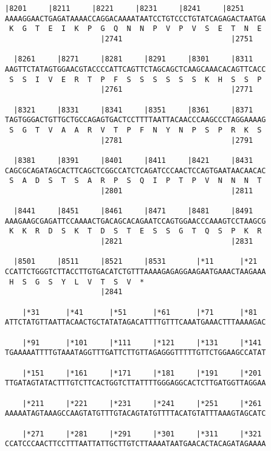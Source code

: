 \documentclass{article}
\begin{document}
\newpage
\begin{Verbatim}[fontfamily=courier]
  |8201     |8211     |8221     |8231     |8241     |8251   
AAAAGGAACTGAGATAAAACCAGGACAAAATAATCCTGTCCCTGTATCAGAGACTAATGA
 K  G  T  E  I  K  P  G  Q  N  N  P  V  P  V  S  E  T  N  E 
                      |2741                         |2751   

  |8261     |8271     |8281     |8291     |8301     |8311   
AAGTTCTATAGTGGAACGTACCCCATTCAGTTCTAGCAGCTCAAGCAAACACAGTTCACC
 S  S  I  V  E  R  T  P  F  S  S  S  S  S  S  K  H  S  S  P 
                      |2761                         |2771   

  |8321     |8331     |8341     |8351     |8361     |8371   
TAGTGGGACTGTTGCTGCCAGAGTGACTCCTTTTAATTACAACCCAAGCCCTAGGAAAAG
 S  G  T  V  A  A  R  V  T  P  F  N  Y  N  P  S  P  R  K  S 
                      |2781                         |2791   

  |8381     |8391     |8401     |8411     |8421     |8431   
CAGCGCAGATAGCACTTCAGCTCGGCCATCTCAGATCCCAACTCCAGTGAATAACAACAC
 S  A  D  S  T  S  A  R  P  S  Q  I  P  T  P  V  N  N  N  T 
                      |2801                         |2811   

  |8441     |8451     |8461     |8471     |8481     |8491   
AAAGAAGCGAGATTCCAAAACTGACAGCACAGAATCCAGTGGAACCCAAAGTCCTAAGCG
 K  K  R  D  S  K  T  D  S  T  E  S  S  G  T  Q  S  P  K  R 
                      |2821                         |2831   

  |8501     |8511     |8521     |8531       |*11      |*21  
CCATTCTGGGTCTTACCTTGTGACATCTGTTTAAAAGAGAGGAAGAATGAAACTAAGAAA
 H  S  G  S  Y  L  V  T  S  V  *   
                      |2841                                 

    |*31      |*41      |*51      |*61      |*71      |*81  
ATTCTATGTTAATTACAACTGCTATATAGACATTTTGTTTCAAATGAAACTTTAAAAGAC

    |*91      |*101     |*111     |*121     |*131     |*141 
TGAAAAATTTTGTAAATAGGTTTGATTCTTGTTAGAGGGTTTTTGTTCTGGAAGCCATAT

    |*151     |*161     |*171     |*181     |*191     |*201 
TTGATAGTATACTTTGTCTTCACTGGTCTTATTTTGGGAGGCACTCTTGATGGTTAGGAA

    |*211     |*221     |*231     |*241     |*251     |*261 
AAAAATAGTAAAGCCAAGTATGTTTGTACAGTATGTTTTACATGTATTTAAAGTAGCATC

    |*271     |*281     |*291     |*301     |*311     |*321 
CCATCCCAACTTCCTTTAATTATTGCTTGTCTTAAAATAATGAACACTACAGATAGAAAA

\end{Verbatim}
\end{document}
